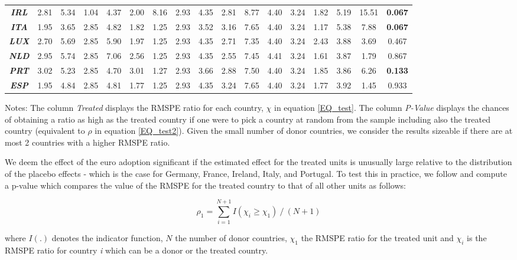 \documentclass[12pt]{article}
\newcommand{\annote}[1]{\parbox{\textwidth}{\renewcommand{\baselinestretch}{1.0}\vspace{12pt} \small Notes: #1}}
\begin{document}
\begin{table}[htbp]
\begin{tabular}{c|cccccccccccccc|c||c}
\textit{\textbf{IRL}} & 2.81 & 5.34 & 1.04 & 4.37 & 2.00 & 8.16 & 2.93 & 4.35 & 2.81 & 8.77 & 4.40 & 3.24 & 1.82 & 5.19 & 15.51 & \textbf{0.067} \\
\textit{\textbf{ITA}} & 1.95 & 3.65 & 2.85 & 4.82 & 1.82 & 1.25 & 2.93 & 3.52 & 3.16 & 7.65 & 4.40 & 3.24 & 1.17 & 5.38 & 7.88  & \textbf{0.067} \\
\textit{\textbf{LUX}} & 2.70 & 5.69 & 2.85 & 5.90 & 1.97 & 1.25 & 2.93 & 4.35 & 2.71 & 7.35 & 4.40 & 3.24 & 2.43 & 3.88 & 3.69  & 0.467  \\
\textit{\textbf{NLD}} & 2.95 & 5.74 & 2.85 & 7.06 & 2.56 & 1.25 & 2.93 & 4.35 & 2.55 & 7.45 & 4.41 & 3.24 & 1.61 & 3.87 & 1.79  & 0.867  \\
\textit{\textbf{PRT}} & 3.02 & 5.23 & 2.85 & 4.70 & 3.01 & 1.27 & 2.93 & 3.66 & 2.88 & 7.50 & 4.40 & 3.24 & 1.85 & 3.86 & 6.26  & \textbf{0.133} \\
\textit{\textbf{ESP}} & 1.95 & 4.84 & 2.85 & 4.81 & 1.77 & 1.25 & 2.93 & 4.35 & 3.24 & 7.65 & 4.40 & 3.24 & 1.77 & 3.92 & 1.45  & 0.933 \\
\bottomrule
\end{tabular} 
\annote{The column \textit{Treated} displays the RMSPE ratio for each country, $\chi$ in equation \ref{EQ_test}. The column \textit{P-Value} displays the chances of obtaining a ratio as high as the treated country if one were to pick a country at random from the sample including also the treated country (equivalent to $\rho$ in equation \ref{EQ_test2}). Given the small number of donor countries, we consider the results sizeable if there are at most 2 countries with a higher RMSPE ratio.}
\end{table}

We deem the effect of the euro adoption significant if the estimated effect for the treated units is unusually large relative to the distribution of the placebo effects - which is the case for Germany, France, Ireland, Italy, and Portugal. To test this in practice, we follow \cite{Abadie2015} and compute a p-value which compares the value of the RMSPE for the treated country to that of all other units as follows:

\begin{equation}
\label{EQ_test2}
    \rho_1 = \sum\limits_{i=1}^{N+1} I(\chi_i \geq \chi_1) \ / \ (N+1)
\end{equation}

where $I(.)$ denotes the indicator function, $N$ the number of donor countries, $\chi_1$ the RMSPE ratio for the treated unit and $\chi_i$ is the RMSPE ratio for country \textit{i} which can be a donor or the treated country. 
\end{document}
